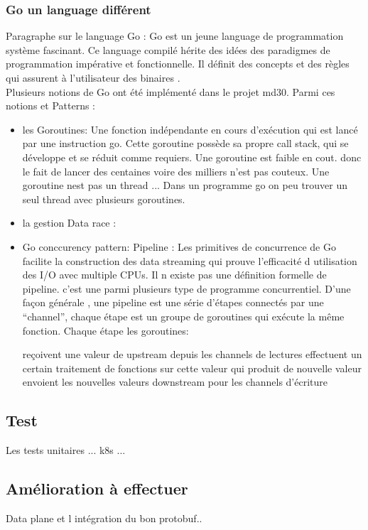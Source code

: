         \subsubsection{Go un language différent}
       
        Paragraphe sur le language Go : 
        Go est un jeune language de programmation système
        fascinant. Ce language compilé hérite des idées des paradigmes de
        programmation impérative et fonctionnelle. Il définit des concepts et
        des règles qui assurent à l'utilisateur des binaires .\\[0.3cm]
       
      
        Plusieurs notions de Go ont été implémenté dans le projet \gls{md30}. Parmi ces notions et Patterns :

        \begin{itemize}
            \item les Goroutines: Une fonction indépendante en cours d'exécution qui est lancé par une instruction go. 
            Cette goroutine possède sa propre call stack, qui se développe et se réduit comme requiers.
            Une goroutine est faible en cout. donc le fait de lancer des centaines voire des milliers n'est pas couteux.
            Une goroutine nest pas un thread ... Dans un programme go on peu trouver un seul thread avec plusieurs goroutines.\\

            \item la gestion Data race : \\

            \item Go conccurency pattern: Pipeline : Les primitives de concurrence de Go facilite la construction 
            des data streaming qui prouve l’efficacité d utilisation des I/O avec multiple CPUs. 
            Il n existe pas une définition formelle de pipeline. c’est une parmi plusieurs type de programme concurrentiel. D'une façon générale , une pipeline est une série d’étapes connectés par une “channel”, chaque étape est un groupe de goroutines qui exécute la même fonction. 
            Chaque étape les goroutines:

                    reçoivent une valeur de upstream depuis les channels de lectures
                    effectuent un certain traitement de fonctions sur cette valeur qui produit de nouvelle valeur 
                    envoient les nouvelles valeurs downstream pour les channels d’écriture



        \end{itemize}

    \subsection{Test }
       

    Les tests unitaires ... 
    k8s ... 

    \subsection{Amélioration à effectuer}
        Data plane et l intégration du bon protobuf.. 
        